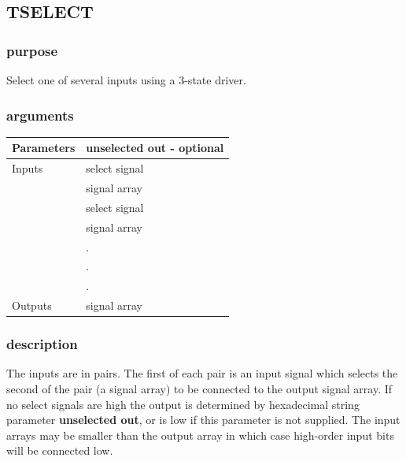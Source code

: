 \documentclass[10pt,a4paper,twoside,fleqn]{book}
\begin{document}
            \subsection{TSELECT}

                \subsubsection{purpose}

                    Select one of several inputs using a 3-state driver.

                \subsubsection{arguments}

                    \begin{tabular}{| l | l |}
                    \hline
                    Parameters  & unselected out - optional \\
                    \hline
                    Inputs      & select signal \\
                                & signal array \\
                                & select signal \\
                                & signal array \\
                                & . \\
                                & . \\
                                & . \\
                    \hline
                    Outputs     & signal array \\
                    \hline
                    \end{tabular}

                \subsubsection{description}

                    The inputs are in pairs. The first of each pair is an input
                    signal which selects the second of the pair (a signal array)
                    to be connected to the output signal array. If no select
                    signals are high the output is determined by hexadecimal
                    string parameter {\bf unselected out}, or is low if this
                    parameter is not supplied. The input arrays may be smaller
                    than the output array in which case high-order input bits
                    will be connected low.
                    
\end{document}
